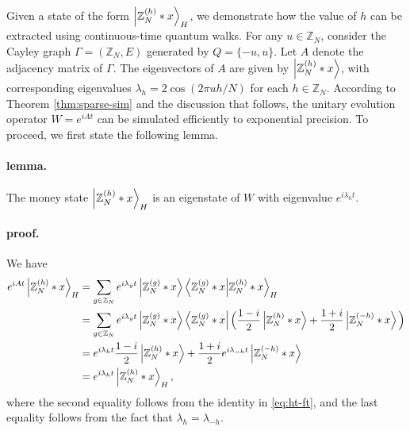 \documentclass[12pt]{report}
\begin{document}
    Given a state of the form $\ket{\mathbb{Z}_N^{(h)} * x}_H$, we demonstrate how the value of $h$ can be extracted using continuous-time quantum walks. For any $u \in \mathbb{Z}_N$, consider the Cayley graph $\Gamma = (\mathbb{Z}_N, E)$ generated by $Q = {\{-u, u}\}$. Let $A$ denote the adjacency matrix of $\Gamma$. The eigenvectors of $A$ are given by $\ket{\mathbb{Z}_N^{(h)} * x}$, with corresponding eigenvalues $\lambda_h = 2\cos(2\pi uh / N)$ for each $h \in \mathbb{Z}_N$. According to Theorem \ref{thm:sparse-sim} and the discussion that follows, the unitary evolution operator $W = e^{iAt}$ can be simulated efficiently to exponential precision. To proceed, we first state the following lemma.




    \paragraph{lemma.}
        \label{lem:h-eigen}
        The money state $\ket{\mathbb{Z}_N^{(h)} * x}_H$ is an eigenstate of $W$ with eigenvalue $e^{i\lambda_h t}$.
    \paragraph{proof.}
        We have 
        \begin{align*}
            e^{iAt} \ket{\mathbb{Z}_N^{(h)} * x}_H
            & = \sum_{g \in \mathbb{Z}_N} e^{i\lambda_gt} \ket{\mathbb{Z}_N^{(g)} * x} \braket{\mathbb{Z}_N^{(g)} * x}{\mathbb{Z}_N^{(h)} * x}_H \\
            & = \sum_{g \in \mathbb{Z}_N} e^{i\lambda_gt} \ket{\mathbb{Z}_N^{(g)} * x} \bra{\mathbb{Z}_N^{(g)} * x} \Big( \frac{1 - i}{2} \ket{\mathbb{Z}_N^{(h)} * x} + \frac{1 + i}{2} \ket{\mathbb{Z}_N^{(-h)} * x} \Big) \\
            & = e^{i\lambda_{h}t} \frac{1 - i}{2} \ket{\mathbb{Z}_N^{(h)} * x} + \frac{1 + i}{2} e^{i\lambda_{-h}t} \ket{\mathbb{Z}_N^{(-h)} * x} \\
            & = e^{i\lambda_{h}t} \ket{\mathbb{Z}_N^{(h)} * x}_H,
        \end{align*}
        where the second equality follows from the identity in \eqref{eq:ht-ft}, and the last equality follows from the fact that $\lambda_h = \lambda_{-h}$.
\end{document}
